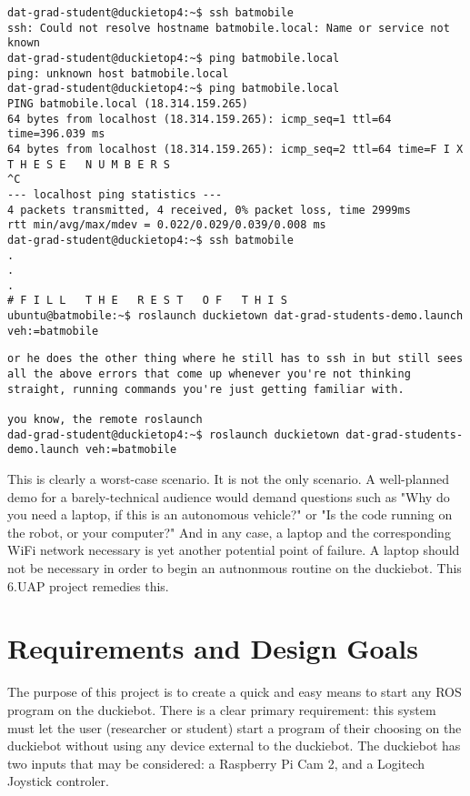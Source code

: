 \documentclass{article}
\begin{document}
\begin{lstlisting}
dat-grad-student@duckietop4:~$ ssh batmobile
ssh: Could not resolve hostname batmobile.local: Name or service not known
dat-grad-student@duckietop4:~$ ping batmobile.local
ping: unknown host batmobile.local
dat-grad-student@duckietop4:~$ ping batmobile.local
PING batmobile.local (18.314.159.265)
64 bytes from localhost (18.314.159.265): icmp_seq=1 ttl=64 time=396.039 ms
64 bytes from localhost (18.314.159.265): icmp_seq=2 ttl=64 time=F I X   T H E S E   N U M B E R S
^C
--- localhost ping statistics ---
4 packets transmitted, 4 received, 0% packet loss, time 2999ms
rtt min/avg/max/mdev = 0.022/0.029/0.039/0.008 ms
dat-grad-student@duckietop4:~$ ssh batmobile
.
.
.
# F I L L   T H E   R E S T   O F   T H I S
ubuntu@batmobile:~$ roslaunch duckietown dat-grad-students-demo.launch veh:=batmobile
\end{lstlisting}
\begin{lstlisting}
or he does the other thing where he still has to ssh in but still sees all the above errors that come up whenever you're not thinking straight, running commands you're just getting familiar with. 

you know, the remote roslaunch
dad-grad-student@duckietop4:~$ roslaunch duckietown dat-grad-students-demo.launch veh:=batmobile
\end{lstlisting}

This is clearly a worst-case scenario. It is not the only scenario. A well-planned demo for a barely-technical audience would demand questions such as "Why do you need a laptop, if this is an autonomous vehicle?" or "Is the code running on the robot, or your computer?" And in any case, a laptop and the corresponding WiFi network necessary is yet another potential point of failure. A laptop should not be necessary in order to begin an autnonmous routine on the duckiebot. This 6.UAP project remedies this. 
\section{Requirements and Design Goals}
The purpose of this project is to create a quick and easy means to start any ROS program on the duckiebot. There is a clear primary requirement: this system must let the user (researcher or student) start a program of their choosing on the duckiebot without using any device external to the duckiebot. The duckiebot has two inputs that may be considered: a Raspberry Pi Cam 2, and a Logitech Joystick controler. 
\end{document}
